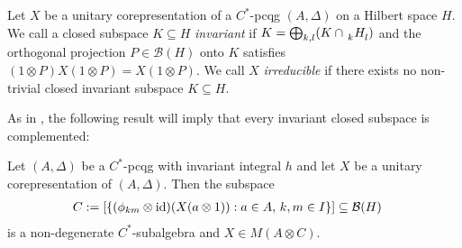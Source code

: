 \begin{Def}
Let $X$ be a unitary corepresentation of a $C^{*}$-pcqg $(A,\Delta)$ on a
  Hilbert space $H$. We call a closed subspace $K\subseteq H$
  \emph{invariant} if $K=\bigoplus_{k,l} (K \cap \Grd{H}{k}{l})$ %
  and
  the orthogonal projection $P\in \mathcal{B}(H)$ onto $K$ satisfies
  $(1\otimes P)X(1\otimes P)=X(1\otimes P)$.  We call $X$
  \emph{irreducible} if there exists no non-trivial closed invariant
  subspace $K\subseteq H$.
\end{Def}
As in \cite{MVD1}, the  following result will imply that every invariant closed subspace is complemented:
 \begin{Prop}\label{prop:corep-complemented}
   Let $(A,\Delta)$ be a $C^{*}$-pcqg with invariant integral $h$ and
   let $X$ be a unitary corepresentation of $(A,\Delta)$. Then the
   subspace %
   \begin{align*}
     C &:= [ \{(\phi_{km} \otimes
     \operatorname{id})(X(a\otimes 1)) : a \in A,\, k,m\in I\}] \subseteq \mathcal{B}(H)
   \end{align*}
   is a non-degenerate $C^{*}$-subalgebra and $X\in M(A\otimes C)$.
 \end{Prop}
